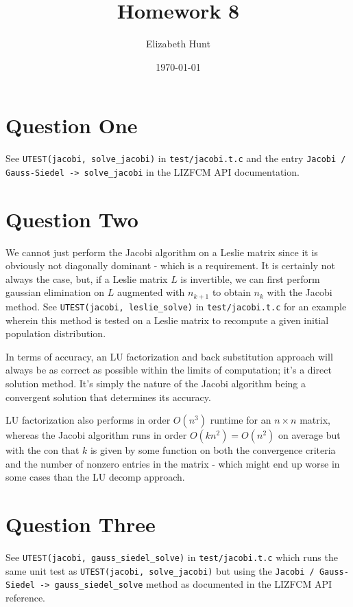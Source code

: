 \documentclass[11pt]{article}
\author{Elizabeth Hunt}
\date{\today}
\title{Homework 8}
\begin{document}
\maketitle
\setlength\parindent{0pt}

\section{Question One}
\label{sec:org800c743}
See \texttt{UTEST(jacobi, solve\_jacobi)} in \texttt{test/jacobi.t.c} and the entry
\texttt{Jacobi / Gauss-Siedel -> solve\_jacobi} in the LIZFCM API documentation.
\section{Question Two}
\label{sec:org6121bef}
We cannot just perform the Jacobi algorithm on a Leslie matrix since
it is obviously not diagonally dominant - which is a requirement. It is
certainly not always the case, but, if a Leslie matrix \(L\) is invertible, we can
first perform gaussian elimination on \(L\) augmented with \(n_{k+1}\)
to obtain \(n_k\) with the Jacobi method. See \texttt{UTEST(jacobi, leslie\_solve)}
in \texttt{test/jacobi.t.c} for an example wherein this method is tested on a Leslie
matrix to recompute a given initial population distribution.

In terms of accuracy, an LU factorization and back substitution approach will
always be as correct as possible within the limits of computation; it's a
direct solution method. It's simply the nature of the Jacobi algorithm being
a convergent solution that determines its accuracy.

LU factorization also performs in order \(O(n^3)\) runtime for an \(n \times n\)
matrix, whereas the Jacobi algorithm runs in order \(O(k n^2) = O(n^2)\) on average
but with the con that \(k\) is given by some function on both the convergence criteria and the number of
nonzero entries in the matrix - which might end up worse in some cases than the LU decomp approach.

\section{Question Three}
\label{sec:org11282e6}
See \texttt{UTEST(jacobi, gauss\_siedel\_solve)} in \texttt{test/jacobi.t.c} which runs the same
unit test as \texttt{UTEST(jacobi, solve\_jacobi)} but using the
\texttt{Jacobi / Gauss-Siedel -> gauss\_siedel\_solve} method as documented in the LIZFCM API reference.
\end{document}
